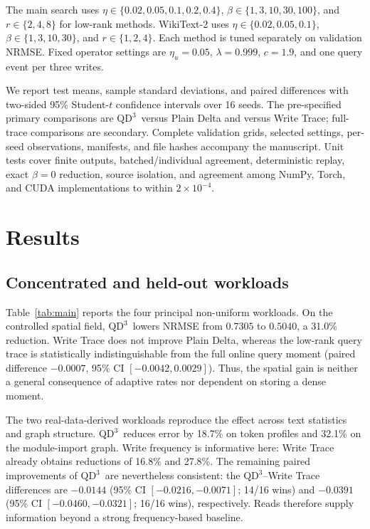 \documentclass[pdflatex,sn-mathphys-num]{sn-jnl}
\theoremstyle{thmstyleone}
\newcommand{\QDDD}{\ensuremath{\mathrm{QD}^{3}}}
\begin{document}
The main search uses $\eta\in\{0.02,0.05,0.1,0.2,0.4\}$, $\beta\in\{1,3,10,30,100\}$, and $r\in\{2,4,8\}$ for low-rank methods. WikiText-2 uses $\eta\in\{0.02,0.05,0.1\}$, $\beta\in\{1,3,10,30\}$, and $r\in\{1,2,4\}$. Each method is tuned separately on validation NRMSE. Fixed operator settings are $\eta_u=0.05$, $\lambda=0.999$, $c=1.9$, and one query event per three writes.

We report test means, sample standard deviations, and paired differences with two-sided 95\% Student-$t$ confidence intervals over 16 seeds. The pre-specified primary comparisons are \QDDD\ versus Plain Delta and versus Write Trace; full-trace comparisons are secondary. Complete validation grids, selected settings, per-seed observations, manifests, and file hashes accompany the manuscript. Unit tests cover finite outputs, batched/individual agreement, deterministic replay, exact $\beta=0$ reduction, source isolation, and agreement among NumPy, Torch, and CUDA implementations to within $2\times10^{-4}$.

\section{Results}\label{sec:results}

\subsection{Concentrated and held-out workloads}

Table~\ref{tab:main} reports the four principal non-uniform workloads. On the controlled spatial field, \QDDD\ lowers NRMSE from $0.7305$ to $0.5040$, a 31.0\% reduction. Write Trace does not improve Plain Delta, whereas the low-rank query trace is statistically indistinguishable from the full online query moment (paired difference $-0.0007$, 95\% CI $[-0.0042,0.0029]$). Thus, the spatial gain is neither a general consequence of adaptive rates nor dependent on storing a dense moment.

The two real-data-derived workloads reproduce the effect across text statistics and graph structure. \QDDD\ reduces error by 18.7\% on token profiles and 32.1\% on the module-import graph. Write frequency is informative here: Write Trace already obtains reductions of 16.8\% and 27.8\%. The remaining paired improvements of \QDDD\ are nevertheless consistent: the \QDDD--Write Trace differences are $-0.0144$ (95\% CI $[-0.0216,-0.0071]$; 14/16 wins) and $-0.0391$ (95\% CI $[-0.0460,-0.0321]$; 16/16 wins), respectively. Reads therefore supply information beyond a strong frequency-based baseline.
\end{document}
